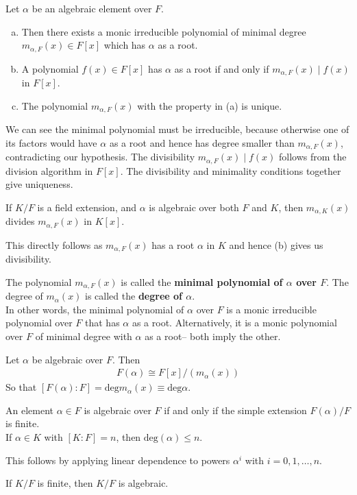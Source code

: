 \documentclass{memoir}
\begin{document}
\begin{prop}
	Let \(\alpha \) be an algebraic element over \(F\).
	\begin{enumerate}[(a).]
		\item Then there exists a monic irreducible polynomial of minimal degree \(m_{\alpha ,F}(x) \in F[x]\) which has \(\alpha \) as a root.
		\item A polynomial \(f(x) \in F[x]\) has \(\alpha \) as a root if and only if \(m_{\alpha ,F}(x) \mid f(x)\) in \(F[x]\).
		\item The polynomial \(m_{\alpha ,F}(x)\) with the property in (a) is unique.
	\end{enumerate}
\end{prop}
We can see the minimal polynomial must be irreducible, because otherwise one of its factors would have \(\alpha \) as a root and hence has degree smaller than \(m_{\alpha ,F}(x)\), contradicting our hypothesis. The divisibility \(m_{\alpha ,F}(x) \mid f(x)\) follows from the division algorithm in \(F[x]\). The divisibility and minimality conditions together give uniqueness.
\begin{cor}
	If \(K / F\) is a field extension, and \(\alpha \) is algebraic over both \(F\) and \(K\), then \(m_{\alpha ,K}(x)\) divides \(m_{\alpha ,F}(x)\) in \(K[x]\).
\end{cor}
This directly follows as \(m_{\alpha ,F}(x)\) has a root \(\alpha \) in \(K\) and hence (b) gives us divisibility.
\begin{defn}
	The polynomial \(m_{\alpha ,F}(x)\) is called the \textbf{minimal polynomial of \(\alpha \) over \(F\)}. The degree of \(m_\alpha (x)\) is called the \textbf{degree of \(\alpha \)}.\\

In other words, the minimal polynomial of \(\alpha \) over \(F\) is a monic irreducible polynomial over \(F\) that has \(\alpha \) as a root. Alternatively, it is a monic polynomial over \(F\) of minimal degree with \(\alpha \) as a root-- both imply the other.
\end{defn}

\begin{prop}
	Let \(\alpha \) be algebraic over \(F\). Then
	\begin{align*}
		F(\alpha ) \cong F[x] / (m_{\alpha }(x))
	\end{align*}
	So that \([F(\alpha ):F] = \textrm{deg}m_{\alpha }(x) \equiv \textrm{deg}\alpha\).
\end{prop}

\begin{prop}
	An element \(\alpha  \in F\) is algebraic over \(F\) if and only if the simple extension \(F(\alpha ) / F\) is finite.\\

	If \(\alpha \in K\) with \([K:F] = n\), then \(\textrm{deg}(\alpha) \leq n\).
\end{prop}
This follows by applying linear dependence to powers \(\alpha^i\) with \(i = 0,1,\ldots,n\).
\begin{cor}
	If \(K / F\) is finite, then \(K / F\) is algebraic.
\end{cor}
\end{document}

